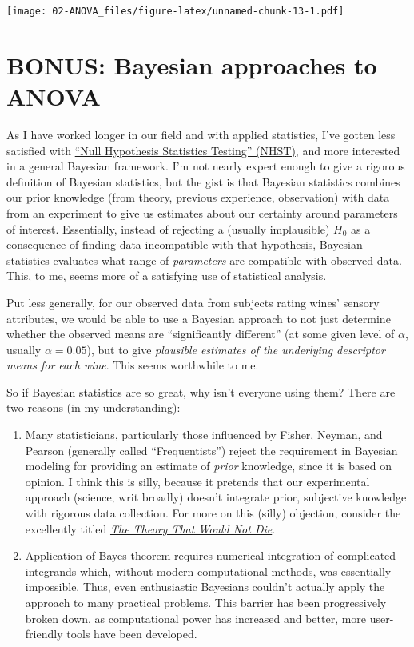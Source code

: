 \documentclass[
]{book}
\providecommand{\tightlist}{%
  \setlength{\itemsep}{0pt}\setlength{\parskip}{0pt}}
\begin{document}
\texttt{[image: 02-ANOVA\_files/figure-latex/unnamed-chunk-13-1.pdf]}

\section{BONUS: Bayesian approaches to ANOVA}\label{bonus-bayesian-approaches-to-anova}

As I have worked longer in our field and with applied statistics, I've gotten less satisfied with \href{https://link.springer.com/article/10.3758/s13423-016-1221-4}{``Null Hypothesis Statistics Testing'' (NHST)}, and more interested in a general Bayesian framework. I'm not nearly expert enough to give a rigorous definition of Bayesian statistics, but the gist is that Bayesian statistics combines our prior knowledge (from theory, previous experience, observation) with data from an experiment to give us estimates about our certainty around parameters of interest. Essentially, instead of rejecting a (usually implausible) \(H_0\) as a consequence of finding data incompatible with that hypothesis, Bayesian statistics evaluates what range of \emph{parameters} are compatible with observed data. This, to me, seems more of a satisfying use of statistical analysis.

Put less generally, for our observed data from subjects rating wines' sensory attributes, we would be able to use a Bayesian approach to not just determine whether the observed means are ``significantly different'' (at some given level of \(\alpha\), usually \(\alpha=0.05\)), but to give \emph{plausible estimates of the underlying descriptor means for each wine}. This seems worthwhile to me.

So if Bayesian statistics are so great, why isn't everyone using them? There are two reasons (in my understanding):

\begin{enumerate}
\def\labelenumi{\arabic{enumi}.}
\tightlist
\item
  Many statisticians, particularly those influenced by Fisher, Neyman, and Pearson (generally called ``Frequentists'') reject the requirement in Bayesian modeling for providing an estimate of \emph{prior} knowledge, since it is based on opinion. I think this is silly, because it pretends that our experimental approach (science, writ broadly) doesn't integrate prior, subjective knowledge with rigorous data collection. For more on this (silly) objection, consider the excellently titled \href{https://yalebooks.yale.edu/book/9780300188226/the-theory-that-would-not-die/}{\emph{The Theory That Would Not Die}}.
\item
  Application of Bayes theorem requires numerical integration of complicated integrands which, without modern computational methods, was essentially impossible. Thus, even enthusiastic Bayesians couldn't actually apply the approach to many practical problems. This barrier has been progressively broken down, as computational power has increased and better, more user-friendly tools have been developed.
\end{enumerate}
\end{document}
